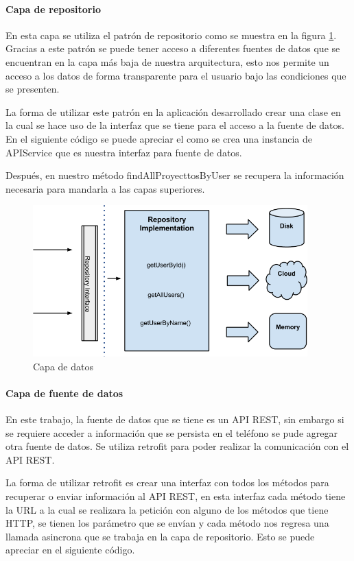 \paragraph{Capa de repositorio} En esta capa se utiliza el patrón de repositorio como se muestra en la figura \ref{fig:capa-datos}. Gracias a este patrón se puede tener acceso a diferentes fuentes de datos que se encuentran en la capa más baja de nuestra arquitectura, esto nos permite un acceso a los datos de forma transparente para el usuario bajo las condiciones que se presenten.

La forma de utilizar este patrón en la aplicación desarrollado crear una clase en la cual se hace uso de la interfaz que se tiene para el acceso a la fuente de datos. En el siguiente código se puede apreciar el como se crea una instancia de APIService que es nuestra interfaz para fuente de datos.

Después, en nuestro método findAllProyecttosByUser se recupera la información necesaria para mandarla a las capas superiores.



\begin{figure}[h]
    \centering
    \includegraphics[width=400px]{capitulo5/android/img/capa-datos.png}
    \caption{Capa de datos \cite{cleanWay}}
    \label{fig:capa-datos}
\end{figure}

\paragraph{Capa de fuente de datos} En este trabajo, la fuente de datos que se tiene es un API REST, sin embargo si se requiere acceder a información que se persista en el teléfono se pude agregar otra fuente de datos. Se utiliza retrofit para poder realizar la comunicación con el API REST. 

La forma de utilizar retrofit es crear una interfaz con todos los métodos para recuperar o enviar información al API REST, en esta interfaz cada método tiene la URL a la cual se realizara la petición con alguno de los métodos que tiene HTTP, se tienen los parámetro que se envían y cada método nos regresa una llamada asincrona que se trabaja en la capa de repositorio. Esto se puede apreciar en el siguiente código.

